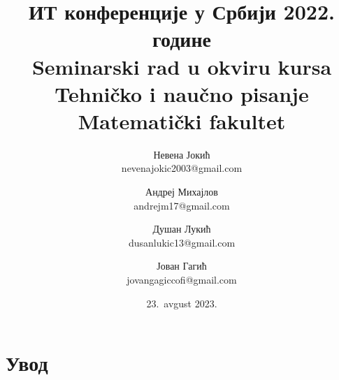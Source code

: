 \documentclass[12pt]{article}
\begin{document}
\title{ИТ конференције у Србији 2022. године\\ \small{Seminarski rad u okviru kursa\\Tehničko i naučno pisanje\\ Matematički fakultet}}
\author{Невена Јокић\\ nevenajokic2003@gmail.com \and Андреј Михајлов\\ andrejm17@gmail.com \and Душан Лукић\\ dusanlukic13@gmail.com \and Јован Гагић\\ jovangagiccofi@gmail.com}
\date{23.~avgust 2023.}
\maketitle
{}

\newpage

\tableofcontents
\newpage

\section{Увод}
\end{document}
